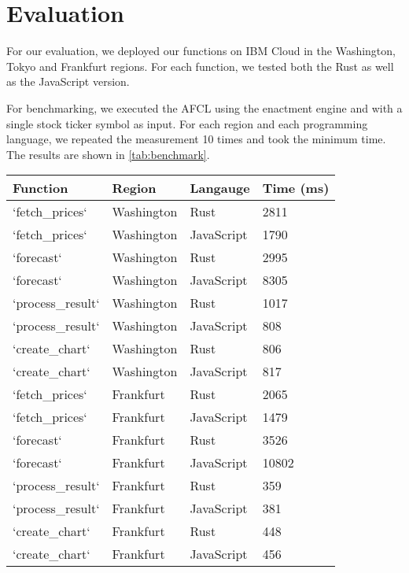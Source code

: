 \chapter{\label{chap:evaluation}Evaluation}

For our evaluation, we deployed our functions on IBM Cloud in the Washington,
Tokyo and Frankfurt regions. For each function, we tested both the Rust as
well as the JavaScript version.

For benchmarking, we executed the AFCL using the enactment engine and with a
single stock ticker symbol as input. For each region and each programming
language, we repeated the measurement 10 times and took the minimum time.
The results are shown in \cref{tab:benchmark}.

\begin{table}[h]
  \centering
  \begin{tabular}{|l|l|l|l|}
    \hline
    Function          & Region     & Langauge   & Time (ms) \\ \hline
    `fetch\_prices`   & Washington & Rust       & 2811      \\ \hline
    `fetch\_prices`   & Washington & JavaScript & 1790      \\ \hline
    `forecast`        & Washington & Rust       & 2995      \\ \hline
    `forecast`        & Washington & JavaScript & 8305      \\ \hline
    `process\_result` & Washington & Rust       & 1017      \\ \hline
    `process\_result` & Washington & JavaScript & 808       \\ \hline
    `create\_chart`   & Washington & Rust       & 806       \\ \hline
    `create\_chart`   & Washington & JavaScript & 817       \\ \hline

    `fetch\_prices`   & Frankfurt & Rust       & 2065       \\ \hline
    `fetch\_prices`   & Frankfurt & JavaScript & 1479       \\ \hline
    `forecast`        & Frankfurt & Rust       & 3526       \\ \hline
    `forecast`        & Frankfurt & JavaScript & 10802      \\ \hline
    `process\_result` & Frankfurt & Rust       & 359        \\ \hline
    `process\_result` & Frankfurt & JavaScript & 381        \\ \hline
    `create\_chart`   & Frankfurt & Rust       & 448        \\ \hline
    `create\_chart`   & Frankfurt & JavaScript & 456        \\ \hline


\end{tabular}
\end{table}
